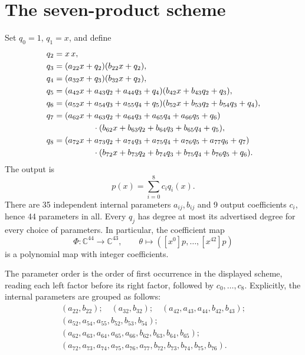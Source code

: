\documentclass[11pt]{article}
\newcommand{\C}{\mathbb C}
\begin{document}
\section{The seven-product scheme}\label{sec:scheme}
Set $q_0=1$, $q_1=x$, and define
\begin{align*}
q_2={}&x\,x,\\
q_3={}&(a_{22}x+q_2)(b_{22}x+q_2),\\
q_4={}&(a_{32}x+q_3)(b_{32}x+q_2),\\
q_5={}&(a_{42}x+a_{43}q_2+a_{44}q_3+q_4)
       (b_{42}x+b_{43}q_2+q_3),\\
q_6={}&(a_{52}x+a_{54}q_3+a_{55}q_4+q_5)
       (b_{52}x+b_{53}q_2+b_{54}q_3+q_4),\\
q_7={}&(a_{62}x+a_{63}q_2+a_{64}q_3+a_{65}q_4+a_{66}q_5+q_6)\\
&\hspace{12mm}\cdot(b_{62}x+b_{63}q_2+b_{64}q_3+b_{65}q_4+q_5),\\
q_8={}&(a_{72}x+a_{73}q_2+a_{74}q_3+a_{75}q_4+a_{76}q_5+a_{77}q_6+q_7)\\
&\hspace{12mm}\cdot(b_{72}x+b_{73}q_2+b_{74}q_3+b_{75}q_4+b_{76}q_5+q_6).
\end{align*}
The output is
\[
p(x)=\sum_{i=0}^8 c_iq_i(x).
\]
There are 35 independent internal parameters $a_{ij},b_{ij}$ and 9 output coefficients $c_i$, hence 44 parameters in all. Every $q_j$ has degree at most its advertised degree for every choice of parameters. In particular, the coefficient map
\[
\Phi:\C^{44}\longrightarrow\C^{43},\qquad
\theta\longmapsto ([x^0]p,\ldots,[x^{42}]p)
\]
is a polynomial map with integer coefficients.

The parameter order is the order of first occurrence in the displayed scheme, reading each left factor before its right factor, followed by $c_0,\ldots,c_8$. Explicitly, the internal parameters are grouped as follows:
\[
\begin{gathered}
(a_{22},b_{22});\quad(a_{32},b_{32});\quad
(a_{42},a_{43},a_{44},b_{42},b_{43});\\
(a_{52},a_{54},a_{55},b_{52},b_{53},b_{54});\\
(a_{62},a_{63},a_{64},a_{65},a_{66},b_{62},b_{63},b_{64},b_{65});\\
(a_{72},a_{73},a_{74},a_{75},a_{76},a_{77},b_{72},b_{73},b_{74},b_{75},b_{76}).
\end{gathered}
\]
\end{document}

